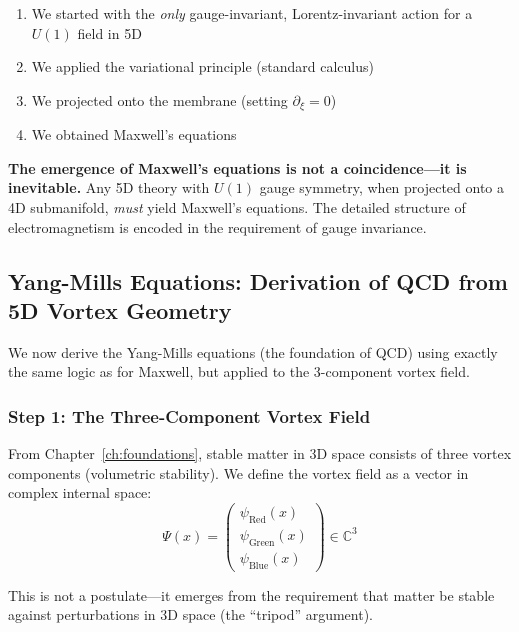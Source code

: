 \begin{enumerate}
    \item We started with the \textit{only} gauge-invariant, Lorentz-invariant action for a $U(1)$ field in 5D
    \item We applied the variational principle (standard calculus)
    \item We projected onto the membrane (setting $\partial_\xi = 0$)
    \item We obtained Maxwell's equations
\end{enumerate}

\textbf{The emergence of Maxwell's equations is not a coincidence---it is inevitable.} Any 5D theory with $U(1)$ gauge symmetry, when projected onto a 4D submanifold, \textit{must} yield Maxwell's equations. The detailed structure of electromagnetism is encoded in the requirement of gauge invariance.

\newpage

\subsection{Yang-Mills Equations: Derivation of QCD from 5D Vortex Geometry}
\label{subsec:yangmills_derivation}

We now derive the Yang-Mills equations (the foundation of QCD) using exactly the same logic as for Maxwell, but applied to the 3-component vortex field.

\subsubsection{Step 1: The Three-Component Vortex Field}

From Chapter~\ref{ch:foundations}, stable matter in 3D space consists of three vortex components (volumetric stability). We define the vortex field as a vector in complex internal space:
\begin{equation}
\Psi(x) = \begin{pmatrix} \psi_{\text{Red}}(x) \\ \psi_{\text{Green}}(x) \\ \psi_{\text{Blue}}(x) \end{pmatrix} \in \mathbb{C}^3
\end{equation}

This is not a postulate---it emerges from the requirement that matter be stable against perturbations in 3D space (the ``tripod'' argument).

